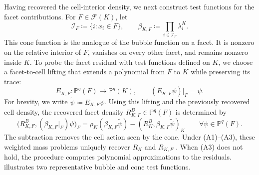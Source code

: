 Having recovered the cell-interior density, we next construct test functions for the facet contributions. For \(F\in\mathcal{F}(K)\), let
\begin{equation}
  \mathcal I_F\coloneqq\{i:x_i\in F\},
  \qquad
  \beta_{K,F}\coloneqq\prod_{i\in\mathcal I_F}\lambda_i^K.
  \label{eq:recovery-facet-cone}
\end{equation}
This cone function is the analogue of the bubble function on a facet. It is nonzero on the relative interior of \(F\), vanishes on every other facet, and remains nonzero inside \(K\).
To probe the facet residual with test functions defined on \(K\), we choose a facet-to-cell lifting that extends a polynomial from \(F\) to \(K\) while preserving its trace:
\[
E_{K,F}:\mathbb{P}^q(F)\longrightarrow\mathbb{P}^q(K),
\qquad
(E_{K,F}\psi)|_F=\psi.
\]
For brevity, we write \(\widetilde{\psi}\coloneqq E_{K,F}\psi\). Using this lifting and the previously recovered cell density, the recovered facet density \(R_{K,F}^B\in\mathbb{P}^q(F)\) is determined by
\begin{equation}
\bigl(R_{K,F}^B,(\beta_{K,F}|_F)\psi\bigr)_F
=
\rho_K(\beta_{K,F}\widetilde{\psi})
-
(R_K^B,\beta_{K,F}\widetilde{\psi})_K
\qquad
\forall\psi\in\mathbb{P}^q(F).
\label{eq:stationary-facet-projection}
\end{equation}
The subtraction removes the cell action seen by the cone. Under (A1)--(A3), these weighted mass problems uniquely recover \(R_K\) and \(R_{K,F}\) \cite{Rognes_Logg_2013}. When (A3) does not hold, the procedure computes polynomial approximations to the residuals.
 illustrates two representative bubble and cone test functions.
\newcommand{\drawcoarsemeshdiagonals}{%
  \addplot3[gray!60, line width=0.25pt]
    coordinates {(0,0,0) (1,1,0)};
  \addplot3[gray!60, line width=0.25pt]
    coordinates {(0,.3333,0) (.6667,1,0)};
  \addplot3[gray!60, line width=0.25pt]
    coordinates {(0,.6667,0) (.3333,1,0)};
  \addplot3[gray!60, line width=0.25pt]
    coordinates {(.3333,0,0) (1,.6667,0)};
  \addplot3[gray!60, line width=0.25pt]
    coordinates {(.6667,0,0) (1,.3333,0)};
}
\vspace{1.6em}
